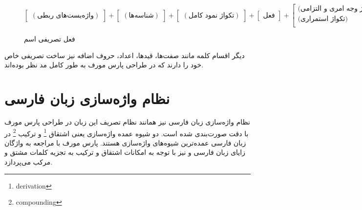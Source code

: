 \documentclass[12pt,onecolumn,a4paper]{article}
\begin{document}
    \begin{figure}[hp]
        \[
            \begin{bmatrix}
                (\textrm{واژه‌بست‌های ربطی})
            \end{bmatrix}
            +
            \begin{bmatrix}
                (\textrm{شناسه‌ها})
            \end{bmatrix}
            +
            \begin{bmatrix}
                (\textrm{تکواژ نمود کامل})
            \end{bmatrix}
            +
            \begin{bmatrix}
                \textrm{فعل}
            \end{bmatrix}
            +
            \begin{bmatrix}
                \textrm{(تکواژ وجه امری و التزامی)} \\
                \textrm{(تکواژ استمراری)} \\
            \end{bmatrix}
            +
            \begin{bmatrix}
                \textrm{تکواژ نفی}
            \end{bmatrix}
        \]
        \caption{فعل تصریفی اسم {\mfo\citep{Eslami88}}}
    \end{figure}

    \par\noindent
    دیگر اقسام کلمه مانند صفت‌ها، قیدها، اعداد، حروف اضافه نیز ساخت تصریفی خاص خود را دارند که در طراحی پارس مورف به طور کامل مد نظر بوده‌اند.

    \section{نظام واژه‌سازی زبان فارسی}
    نظام واژه‌سازی زبان فارسی نیز همانند نظام تصریف این زبان در طراحی پارس مورف با دقت صورت‌بندی شده است. دو شیوه عمده واژه‌سازی یعنی اشتقاق \footnote{derivation} و ترکیب \footnote{compounding} در زبان فارسی عمده‌ترین شیوه‌های واژه‌سازی هستند. پارس مورف با مراجعه به واژگان زایای زبان فارسی {\mfo\citep{Eslami83}} و نیز با توجه به امکانات اشتقاق و ترکیب به تجزیه کلمات مشتق و مرکب می‌پردازد.
\end{document}
